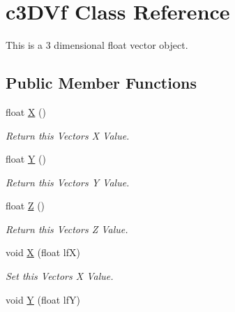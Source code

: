 \hypertarget{classc3_d_vf}{
\section{c3DVf Class Reference}
\label{classc3_d_vf}
}


This is a 3 dimensional float vector object.  


\subsection*{Public Member Functions}
\begin{DoxyCompactItemize}
\item 
\hypertarget{classc3_d_vf_a2304a40da7960b52ab47d18028011e1c}{
float \hyperlink{classc3_d_vf_a2304a40da7960b52ab47d18028011e1c}{X} ()}
\label{classc3_d_vf_a2304a40da7960b52ab47d18028011e1c}

\begin{DoxyCompactList}\small\item\em Return this Vectors X Value. \end{DoxyCompactList}\item 
\hypertarget{classc3_d_vf_a2fb998ffcf6feb5cb74851b0e454e3f2}{
float \hyperlink{classc3_d_vf_a2fb998ffcf6feb5cb74851b0e454e3f2}{Y} ()}
\label{classc3_d_vf_a2fb998ffcf6feb5cb74851b0e454e3f2}

\begin{DoxyCompactList}\small\item\em Return this Vectors Y Value. \end{DoxyCompactList}\item 
\hypertarget{classc3_d_vf_aec04e18360364105fee47d174ecee2e6}{
float \hyperlink{classc3_d_vf_aec04e18360364105fee47d174ecee2e6}{Z} ()}
\label{classc3_d_vf_aec04e18360364105fee47d174ecee2e6}

\begin{DoxyCompactList}\small\item\em Return this Vectors Z Value. \end{DoxyCompactList}\item 
\hypertarget{classc3_d_vf_ab13d16d50e0f7dba0ea2447be5ac67ef}{
void \hyperlink{classc3_d_vf_ab13d16d50e0f7dba0ea2447be5ac67ef}{X} (float lfX)}
\label{classc3_d_vf_ab13d16d50e0f7dba0ea2447be5ac67ef}

\begin{DoxyCompactList}\small\item\em Set this Vectors X Value. \end{DoxyCompactList}\item 
\hypertarget{classc3_d_vf_a91e037c2a783a6ce95d70b41193a9674}{
void \hyperlink{classc3_d_vf_a91e037c2a783a6ce95d70b41193a9674}{Y} (float lfY)}
\label{classc3_d_vf_a91e037c2a783a6ce95d70b41193a9674}


\end{DoxyCompactItemize}
